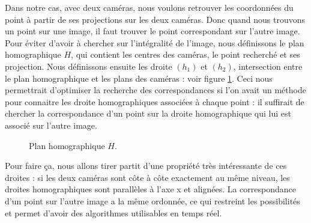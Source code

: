 \documentclass{article}
\begin{document}
Dans notre cas, avec deux caméras, nous voulons retrouver les coordonnées du point à partir de ses projections sur les deux caméras. Donc quand nous trouvons un point sur une image, il faut trouver le point correspondant sur l'autre image. Pour éviter d'avoir à chercher sur l'intégralité de l'image, nous définissons le plan homographique $H$, qui contient les centres des caméras, le point recherché et ses projection. Nous définissons ensuite les droite $(h_1)$ et $(h_2)$, intersection entre le plan homographique et les plans des caméras : voir figure \ref{homo}. Ceci nous permettrait d'optimiser la recherche des correspondances si l'on avait un méthode pour connaitre les droite homographiques associées à chaque point : il suffirait de chercher la correspondance d'un point sur la droite homographique qui lui est associé sur l'autre image.

\begin{figure}
    \begin{center}
    \end{center}
    \caption{Plan homographique $H$.}
    \label{homo}
\end{figure}

Pour faire ça, nous allons tirer partit d'une propriété très intéressante de ces droites : si les deux caméras sont côte à côte exactement au même niveau, les droites homographiques sont parallèles à l'axe x et alignées. La correspondance d'un point sur l'autre image a la même ordonnée, ce qui restreint les possibilités et permet d'avoir des algorithmes utilisables en temps réel.
\end{document}
